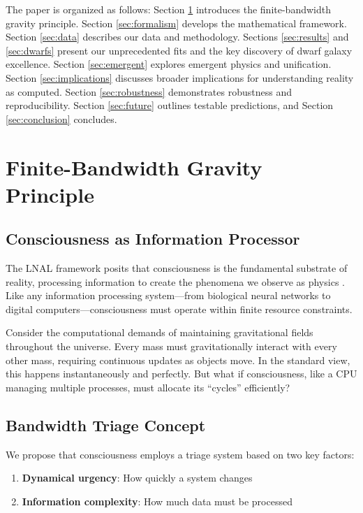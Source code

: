 \documentclass[twocolumn,prd,amsmath,amssymb,aps,superscriptaddress,nofootinbib]{revtex4-2}
\begin{document}
The paper is organized as follows: Section \ref{sec:bandwidth} introduces the finite-bandwidth gravity principle. Section \ref{sec:formalism} develops the mathematical framework. Section \ref{sec:data} describes our data and methodology. Sections \ref{sec:results} and \ref{sec:dwarfs} present our unprecedented fits and the key discovery of dwarf galaxy excellence. Section \ref{sec:emergent} explores emergent physics and unification. Section \ref{sec:implications} discusses broader implications for understanding reality as computed. Section \ref{sec:robustness} demonstrates robustness and reproducibility. Section \ref{sec:future} outlines testable predictions, and Section \ref{sec:conclusion} concludes.

\section{Finite-Bandwidth Gravity Principle}
\label{sec:bandwidth}

\subsection{Consciousness as Information Processor}

The LNAL framework posits that consciousness is the fundamental substrate of reality, processing information to create the phenomena we observe as physics \cite{Washburn2024}. Like any information processing system---from biological neural networks to digital computers---consciousness must operate within finite resource constraints.

Consider the computational demands of maintaining gravitational fields throughout the universe. Every mass must gravitationally interact with every other mass, requiring continuous updates as objects move. In the standard view, this happens instantaneously and perfectly. But what if consciousness, like a CPU managing multiple processes, must allocate its ``cycles'' efficiently?

\subsection{Bandwidth Triage Concept}

We propose that consciousness employs a triage system based on two key factors:
\begin{enumerate}
\item \textbf{Dynamical urgency}: How quickly a system changes
\item \textbf{Information complexity}: How much data must be processed
\end{enumerate}
\end{document}
